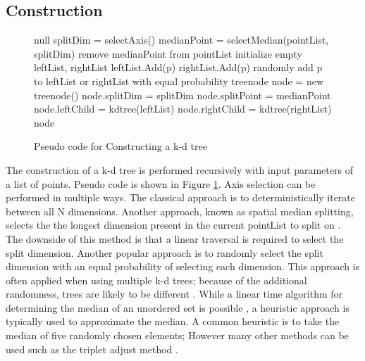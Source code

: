 \subsection{Construction}
\label{subsec:const}

\begin{figure}
\begin{algorithmic}
		\State \Return null
	\EndIf
	\State splitDim = selectAxis()
	\State
	\State medianPoint = selectMedian(pointList, splitDim)
	\State remove medianPoint from pointList
	\State initialize empty leftList, rightList
			\State leftList.Add(p)
			\State rightList.Add(p)
		\Else
			\State randomly add p to leftList or rightList with equal probability
		\EndIf
	\EndFor
	\State
	\State treenode node = new treenode()
	\State node.splitDim = splitDim
	\State node.splitPoint = medianPoint
	\State node.leftChild = kdtree(leftList)
	\State node.rightChild = kdtree(rightList)
	\State \Return node
\EndFunction
\end{algorithmic}
\caption{Pseudo code for Constructing a k-d tree}
\label{alg:createkd}
\end{figure}

The construction of a k-d tree is performed recursively with input parameters of a list of points.  Pseudo code is shown in Figure \ref{alg:createkd}.  Axis selection can be performed in multiple ways.  The classical approach is to deterministically iterate between all N dimensions.  Another approach, known as spatial median splitting, selects the the longest dimension present in the current pointList to split on \citep{zhou2008real}.  The downside of this method is that a linear traversal is required to select the split dimension.  Another popular approach is to randomly select the split dimension with an equal probability of selecting each dimension.  This approach is often applied when using multiple k-d trees; because of the additional randomness, trees are likely to be different \citep{flann_pami_2014}.  While a linear time algorithm for determining the median of an unordered set is possible \citep{megiddo1984linear}, a heuristic approach is typically used to approximate the median.  A common heuristic is to take the median of five randomly chosen elements; However many other methods can be used such as the triplet adjust method \citep{battiato2000efficient}.


